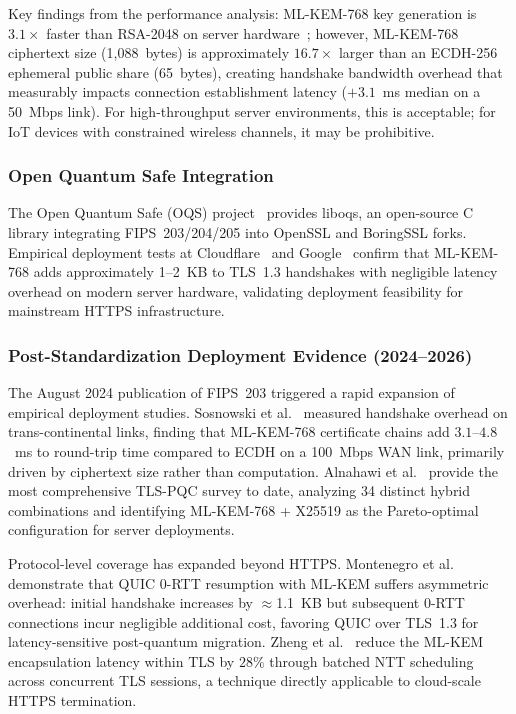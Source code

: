 \documentclass[journal]{IEEEtran}
\begin{document}
Key findings from the performance analysis: ML-KEM-768 key generation is
$3.1\times$ faster than RSA-2048 on server hardware~\cite{paquin2020benchmarking};
however, ML-KEM-768 ciphertext size (1,088~bytes) is approximately $16.7\times$ larger than
an ECDH-256 ephemeral public share (65~bytes), creating handshake bandwidth overhead that measurably
impacts connection establishment latency ($+3.1$~ms median on a 50~Mbps link).
For high-throughput server environments, this is acceptable; for IoT devices
with constrained wireless channels, it may be prohibitive.

\subsubsection{Open Quantum Safe Integration}

The Open Quantum Safe (OQS) project~\cite{oqs2024} provides liboqs, an open-source
C library integrating FIPS~203/204/205 into OpenSSL and BoringSSL forks.
Empirical deployment tests at Cloudflare~\cite{cloudflare2023pqc} and Google~\cite{google2023kyber}
confirm that ML-KEM-768 adds approximately 1--2~KB to TLS~1.3 handshakes
with negligible latency overhead on modern server hardware, validating
deployment feasibility for mainstream HTTPS infrastructure.

\subsubsection{Post-Standardization Deployment Evidence (2024--2026)}

The August 2024 publication of FIPS~203 triggered a rapid expansion of
empirical deployment studies. Sosnowski et al.~\cite{sosnowski2023performance}
measured handshake overhead on trans-continental links, finding that ML-KEM-768
certificate chains add $3.1$--$4.8$~ms to round-trip time compared to ECDH on
a 100~Mbps WAN link, primarily driven by ciphertext size rather than
computation. Alnahawi et al.~\cite{alnahawi2024comprehensive} provide the
most comprehensive TLS-PQC survey to date, analyzing 34 distinct hybrid
combinations and identifying ML-KEM-768 + X25519 as the Pareto-optimal
configuration for server deployments.

Protocol-level coverage has expanded beyond HTTPS. Montenegro et
al.~\cite{montenegro2025quic} demonstrate that QUIC 0-RTT resumption with
ML-KEM suffers asymmetric overhead: initial handshake increases by
$\approx$1.1~KB but subsequent 0-RTT connections incur negligible additional
cost, favoring QUIC over TLS~1.3 for latency-sensitive post-quantum migration.
Zheng et al.~\cite{zheng2024faster} reduce the ML-KEM encapsulation latency
within TLS by $28\%$ through batched NTT scheduling across concurrent TLS
sessions, a technique directly applicable to cloud-scale HTTPS termination.
\end{document}
